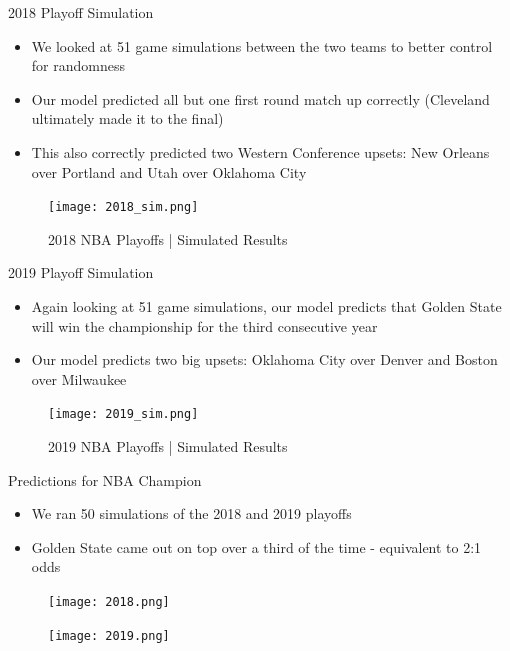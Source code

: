 \documentclass{beamer}
\begin{document}
\begin{frame}{2018 Playoff Simulation}

\begin{itemize}
    \item We looked at 51 game simulations between the two teams to better control for randomness
    \item Our model predicted all but one first round match up correctly (Cleveland ultimately made it to the final)
    \item This also correctly predicted two Western Conference upsets: New Orleans over Portland and Utah over Oklahoma City
\end{itemize}

\vspace{-3mm}

\begin{figure}
\texttt{[image: 2018\_sim.png]}
\caption{2018 NBA Playoffs | Simulated Results}
\end{figure}
\end{frame}

\begin{frame}{2019 Playoff Simulation}

\begin{itemize}
    \item Again looking at 51 game simulations, our model predicts that Golden State will win the championship for the third consecutive year
    \item Our model predicts two big upsets: Oklahoma City over Denver and Boston over Milwaukee
\end{itemize}

\vspace{-5mm}

\begin{figure}
\texttt{[image: 2019\_sim.png]}
\caption{2019 NBA Playoffs | Simulated Results}
\end{figure}
\end{frame}


\begin{frame}{Predictions for NBA Champion}
\begin{itemize}
    \item We ran 50 simulations of the 2018 and 2019 playoffs
    \item Golden State came out on top over a third of the time - equivalent to 2:1 odds
\end{itemize}

\begin{figure}[!htb]
   \begin{minipage}{0.5\textwidth}
     \centering
     \texttt{[image: 2018.png]}
   \end{minipage}\hfill
   \begin{minipage}{0.5\textwidth}
     \centering
     \texttt{[image: 2019.png]}
   \end{minipage}
\end{figure}
\end{frame}
\end{document}
